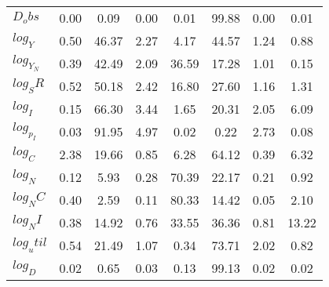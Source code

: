 \begin{center}
\begin{longtable}{lccccccc}
$D_obs     $	 & 	        0.00	 & 	        0.09	 & 	        0.00	 & 	        0.01	 & 	       99.88	 & 	        0.00	 & 	        0.01 \\ 
$log_Y     $	 & 	        0.50	 & 	       46.37	 & 	        2.27	 & 	        4.17	 & 	       44.57	 & 	        1.24	 & 	        0.88 \\ 
$log_Y_N   $	 & 	        0.39	 & 	       42.49	 & 	        2.09	 & 	       36.59	 & 	       17.28	 & 	        1.01	 & 	        0.15 \\ 
$log_SR    $	 & 	        0.52	 & 	       50.18	 & 	        2.42	 & 	       16.80	 & 	       27.60	 & 	        1.16	 & 	        1.31 \\ 
$log_I     $	 & 	        0.15	 & 	       66.30	 & 	        3.44	 & 	        1.65	 & 	       20.31	 & 	        2.05	 & 	        6.09 \\ 
$log_p_I   $	 & 	        0.03	 & 	       91.95	 & 	        4.97	 & 	        0.02	 & 	        0.22	 & 	        2.73	 & 	        0.08 \\ 
$log_C     $	 & 	        2.38	 & 	       19.66	 & 	        0.85	 & 	        6.28	 & 	       64.12	 & 	        0.39	 & 	        6.32 \\ 
$log_N     $	 & 	        0.12	 & 	        5.93	 & 	        0.28	 & 	       70.39	 & 	       22.17	 & 	        0.21	 & 	        0.92 \\ 
$log_NC    $	 & 	        0.40	 & 	        2.59	 & 	        0.11	 & 	       80.33	 & 	       14.42	 & 	        0.05	 & 	        2.10 \\ 
$log_NI    $	 & 	        0.38	 & 	       14.92	 & 	        0.76	 & 	       33.55	 & 	       36.36	 & 	        0.81	 & 	       13.22 \\ 
$log_util  $	 & 	        0.54	 & 	       21.49	 & 	        1.07	 & 	        0.34	 & 	       73.71	 & 	        2.02	 & 	        0.82 \\ 
$log_D     $	 & 	        0.02	 & 	        0.65	 & 	        0.03	 & 	        0.13	 & 	       99.13	 & 	        0.02	 & 	        0.02 \\ 
\end{longtable}
 \end{center}
